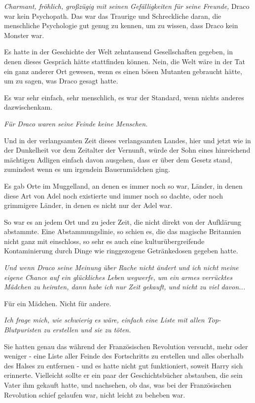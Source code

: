 {\emph{Charmant, fröhlich, großzügig mit seinen Gefälligkeiten für seine Freunde,} Draco war kein Psychopath. Das war das Traurige und Schreckliche daran, die menschliche Psychologie gut genug zu kennen, um zu wissen, dass Draco kein Monster war.

Es hatte in der Geschichte der Welt zehntausend Gesellschaften gegeben, in denen dieses Gespräch hätte stattfinden können. Nein, die Welt wäre in der Tat ein ganz anderer Ort gewesen, wenn es einen bösen Mutanten gebraucht hätte, um zu sagen, was Draco gesagt hatte.

Es war sehr einfach, sehr menschlich, es war der Standard, wenn nichts anderes dazwischenkam.

\emph{Für Draco waren seine Feinde keine Menschen}.

Und in der verlangsamten Zeit dieses verlangsamten Landes, hier und jetzt wie in der Dunkelheit vor dem Zeitalter der Vernunft, würde der Sohn eines hinreichend mächtigen Adligen einfach davon ausgehen, dass er über dem Gesetz stand, zumindest wenn es um irgendein Bauernmädchen ging.

Es gab Orte im Muggelland, an denen es immer noch so war, Länder, in denen diese Art von Adel noch existierte und immer noch so dachte, oder noch grimmigere Länder, in denen es nicht nur der Adel war.

So war es an jedem Ort und zu jeder Zeit, die nicht direkt von der Aufklärung abstammte. Eine Abstammungslinie, so schien es, die das magische Britannien nicht ganz mit einschloss, so sehr es auch eine kulturübergreifende Kontaminierung durch Dinge wie ringgezogene Getränkedosen gegeben hatte.

\emph{Und wenn Draco seine Meinung über Rache nicht ändert und ich nicht meine eigene Chance auf ein glückliches Leben wegwerfe, um ein armes verrücktes Mädchen zu heiraten, dann habe ich nur Zeit gekauft, und nicht zu viel davon...}

Für ein Mädchen. Nicht für andere.

\emph{Ich frage mich, wie schwierig es wäre, einfach eine Liste mit allen Top-Blutpuristen zu erstellen und sie zu töten.}

Sie hatten genau das während der Französischen Revolution versucht, mehr oder weniger - eine Liste aller Feinde des Fortschritts zu erstellen und alles oberhalb des Halses zu entfernen - und es hatte nicht gut funktioniert, soweit Harry sich erinnerte. Vielleicht sollte er ein paar der Geschichtsbücher abstauben, die sein Vater ihm gekauft hatte, und nachsehen, ob das, was bei der Französischen Revolution schief gelaufen war, nicht leicht zu beheben war.

}
